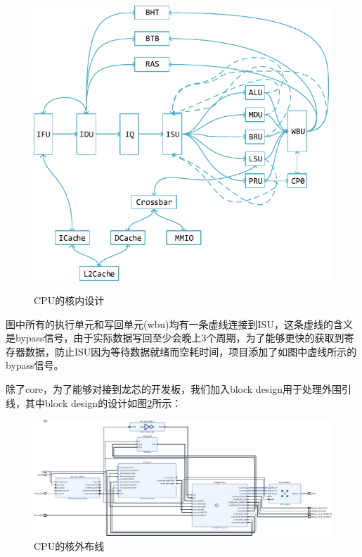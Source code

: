\documentclass[lang=cn,11pt,a4paper]{elegantpaper}
\begin{document}
\begin{figure}[htbp]
	\centering
	\includegraphics[]{image/core}\\
	\caption{CPU的核内设计}\label{fig:design_of_core}
\end{figure}

图中所有的执行单元和写回单元(wbu)均有一条虚线连接到ISU，这条虚线的含义是bypass信号，由于实际数据写回至少会晚上3个周期，为了能够更快的获取到寄存器数据，防止ISU因为等待数据就绪而空耗时间，项目添加了如图中虚线所示的bypass信号。

除了core，为了能够对接到龙芯的开发板，我们加入block design用于处理外围引线，其中block design的设计如图\ref{fig:design_of_uncore}所示：

\begin{figure}[ht]
	\centering
	\includegraphics[width=\textwidth]{image/uncore.png}
	\caption{CPU的核外布线}\label{fig:design_of_uncore}
\end{figure}
\end{document}
